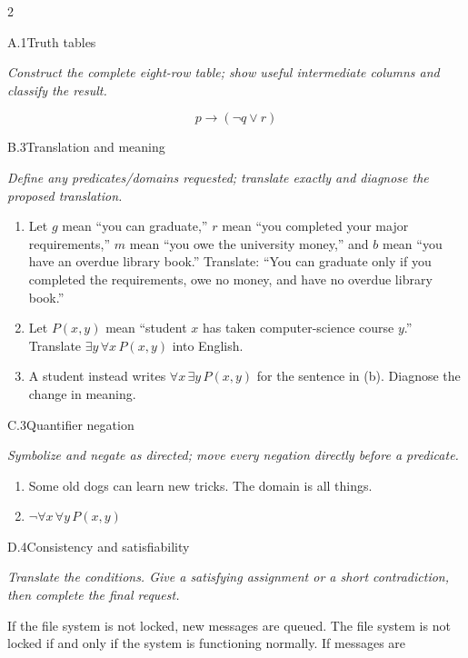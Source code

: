 \documentclass[9pt]{extarticle}
\begin{document}
\begin{multicols}{2}
\begin{CoreProblem}{A.1}{Truth tables}
{\scriptsize\textit{Construct the complete eight-row table; show useful intermediate columns and classify the result.}\par}
\[
  p\to(\neg q\lor r)
\]
\end{CoreProblem}
\begin{CoreProblem}{B.3}{Translation and meaning}
{\scriptsize\textit{Define any predicates/domains requested; translate exactly and diagnose the proposed translation.}\par}
\begin{enumerate}[label=(\alph*)]
  \item Let $g$ mean ``you can graduate,'' $r$ mean ``you completed your major
        requirements,'' $m$ mean ``you owe the university money,'' and $b$
        mean ``you have an overdue library book.'' Translate: ``You can
        graduate only if you completed the requirements, owe no money, and
        have no overdue library book.''
  \item Let $P(x,y)$ mean ``student $x$ has taken computer-science course
        $y$.'' Translate $\exists y\,\forall x\,P(x,y)$ into English.
  \item A student instead writes $\forall x\,\exists y\,P(x,y)$ for the
        sentence in (b). Diagnose the change in meaning.
\end{enumerate}
\end{CoreProblem}
\begin{CoreProblem}{C.3}{Quantifier negation}
{\scriptsize\textit{Symbolize and negate as directed; move every negation directly before a predicate.}\par}
\begin{enumerate}[label=(\alph*)]
  \item Some old dogs can learn new tricks. The domain is all things.
  \item $\neg\forall x\,\forall y\,P(x,y)$
\end{enumerate}
\end{CoreProblem}
\columnbreak
\begin{CoreProblem}{D.4}{Consistency and satisfiability}
{\scriptsize\textit{Translate the conditions. Give a satisfying assignment or a short contradiction, then complete the final request.}\par}
If the file system is not locked, new messages are queued. The file system is
not locked if and only if the system is functioning normally. If messages are

\end{CoreProblem}
\end{multicols}
\end{document}
